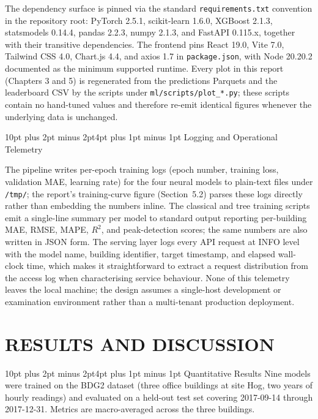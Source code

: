 \documentclass[12pt,a4paper,openany]{report}
\makeatletter
\renewcommand{\section}{\@startsection{section}{1}{\z@}%
  {10pt plus 2pt minus 2pt}{4pt plus 1pt minus 1pt}%
  {\normalfont\normalsize\bfseries}}
\makeatother
\begin{document}
The dependency surface is pinned via the standard \texttt{requirements.txt} convention in the repository root: PyTorch 2.5.1, scikit-learn 1.6.0, XGBoost 2.1.3, statsmodels 0.14.4, pandas 2.2.3, numpy 2.1.3, and FastAPI 0.115.x, together with their transitive dependencies. The frontend pins React 19.0, Vite 7.0, Tailwind CSS 4.0, Chart.js 4.4, and axios 1.7 in \texttt{package.json}, with Node 20.20.2 documented as the minimum supported runtime. Every plot in this report (Chapters 3 and 5) is regenerated from the predictions Parquets and the leaderboard CSV by the scripts under \texttt{ml/scripts/plot\_*.py}; these scripts contain no hand-tuned values and therefore re-emit identical figures whenever the underlying data is unchanged.

\section{Logging and Operational Telemetry}

The pipeline writes per-epoch training logs (epoch number, training loss, validation MAE, learning rate) for the four neural models to plain-text files under \texttt{/tmp/}; the report's training-curve figure (Section~5.2) parses these logs directly rather than embedding the numbers inline. The classical and tree training scripts emit a single-line summary per model to standard output reporting per-building MAE, RMSE, MAPE, $R^2$, and peak-detection scores; the same numbers are also written in JSON form. The serving layer logs every API request at INFO level with the model name, building identifier, target timestamp, and elapsed wall-clock time, which makes it straightforward to extract a request distribution from the access log when characterising service behaviour. None of this telemetry leaves the local machine; the design assumes a single-host development or examination environment rather than a multi-tenant production deployment.

\chapter{RESULTS AND DISCUSSION}
\section{Quantitative Results}
Nine models were trained on the BDG2 dataset (three office buildings at site Hog, two years of hourly readings) and evaluated on a held-out test set covering 2017-09-14 through 2017-12-31. Metrics are macro-averaged across the three buildings.
\end{document}
